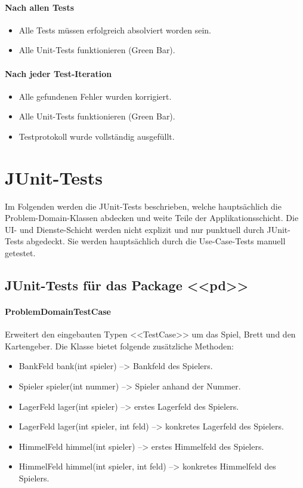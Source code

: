 \documentclass[12pt,halfparskip]{scrartcl}
\begin{document}
	\paragraph{Nach allen Tests}\label{ssub:nach_allen_tests} %
		\begin{itemize}
			\item Alle Tests müssen erfolgreich absolviert worden sein.
			\item Alle Unit-Tests funktionieren (Green Bar).
		\end{itemize}
	\paragraph{Nach jeder Test-Iteration}\label{ssub:nach_jeder_test_iteration} %
		\begin{itemize}
			\item Alle gefundenen Fehler wurden korrigiert.
			\item Alle Unit-Tests funktionieren (Green Bar).
			\item Testprotokoll wurde vollständig ausgefüllt.
		\end{itemize}

\section{JUnit-Tests}\label{sec:junit_tests} %
Im Folgenden werden die JUnit-Tests beschrieben, welche hauptsächlich die Problem-Domain-Klassen abdecken und weite Teile der Applikationsschicht. Die UI- und Dienste-Schicht werden nicht explizit und nur punktuell durch JUnit-Tests abgedeckt. Sie werden hauptsächlich durch die Use-Case-Tests manuell getestet.
\subsection{JUnit-Tests für das Package <<pd>>}\label{sub:junit_tests_für_das_package_pd_} %
	\paragraph{ProblemDomainTestCase}\label{ssub:problemdomaintestcase} %
	Erweitert den eingebauten Typen <<TestCase>> um das Spiel, Brett und den Kartengeber. Die Klasse bietet folgende zusätzliche Methoden:
	\begin{itemize}
		\item BankFeld bank(int spieler) --> Bankfeld des Spielers.
		\item Spieler spieler(int nummer) --> Spieler anhand der Nummer.
		\item LagerFeld lager(int spieler) --> erstes Lagerfeld des Spielers.
		\item LagerFeld lager(int spieler, int feld) --> konkretes Lagerfeld des Spielers.
		\item HimmelFeld himmel(int spieler) --> erstes Himmelfeld des Spielers.
		\item HimmelFeld himmel(int spieler, int feld) --> konkretes Himmelfeld des Spielers.
	\end{itemize}
\end{document}
